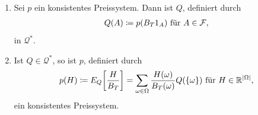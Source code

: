 \documentclass[a4paper,twoside,DIV15,BCOR12mm]{scrbook}
\newcommand{\cF}{\mathcal F}
\newcommand{\cQ}{\mathcal Q}
\begin{document}
\begin{satz}
\begin{enumerate}
\item Sei $p$ ein konsistentes Preissystem. Dann ist $Q$, definiert durch 
\begin{align*}
Q(A) \da p(B_T1_A) \text{ für } A\in \cF,
\end{align*}
in $\cQ^*$.
\item Ist $Q\in \cQ^*$, so ist $p$, definiert durch
\begin{align*}
p(H) \da E_Q\bigg[\frac H {B_T}\bigg] = \sum_{\omega\in\Omega} \frac{H(\omega)}{B_T(\omega)} Q(\{\omega\}) \text{ für } H\in\MdR^{|\Omega|},
\end{align*}
ein konsistentes Preissystem.
\end{enumerate}\label{satz:2.8.3}
\end{satz}
\end{document}
